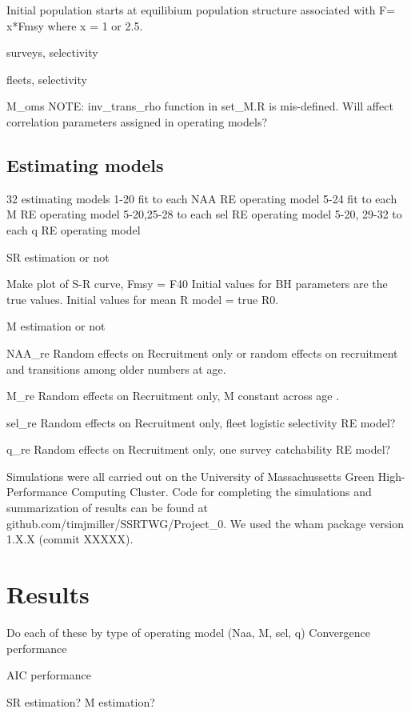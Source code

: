 \documentclass[
  12pt,
]{article}
\begin{document}
Initial population starts at equilibium population structure associated
with F= x*Fmsy where x = 1 or 2.5.

surveys, selectivity

fleets, selectivity

M\_oms NOTE: inv\_trans\_rho function in set\_M.R is mis-defined. Will
affect correlation parameters assigned in operating models?

\hypertarget{estimating-models}{%
\subsection{Estimating models}\label{estimating-models}}

32 estimating models 1-20 fit to each NAA RE operating model 5-24 fit to
each M RE operating model 5-20,25-28 to each sel RE operating model
5-20, 29-32 to each q RE operating model

SR estimation or not

Make plot of S-R curve, Fmsy = F40 Initial values for BH parameters are
the true values. Initial values for mean R model = true R0.

M estimation or not

NAA\_re Random effects on Recruitment only or random effects on
recruitment and transitions among older numbers at age.

M\_re Random effects on Recruitment only, M constant across age .

sel\_re Random effects on Recruitment only, fleet logistic selectivity
RE model?

q\_re Random effects on Recruitment only, one survey catchability RE
model?

Simulations were all carried out on the University of Massachussetts
Green High-Performance Computing Cluster. Code for completing the
simulations and summarization of results can be found at
github.com/timjmiller/SSRTWG/Project\_0. We used the wham package
version 1.X.X (commit XXXXX).

\hypertarget{results}{%
\section{Results}\label{results}}

Do each of these by type of operating model (Naa, M, sel, q) Convergence
performance

AIC performance

SR estimation? M estimation?
\end{document}
